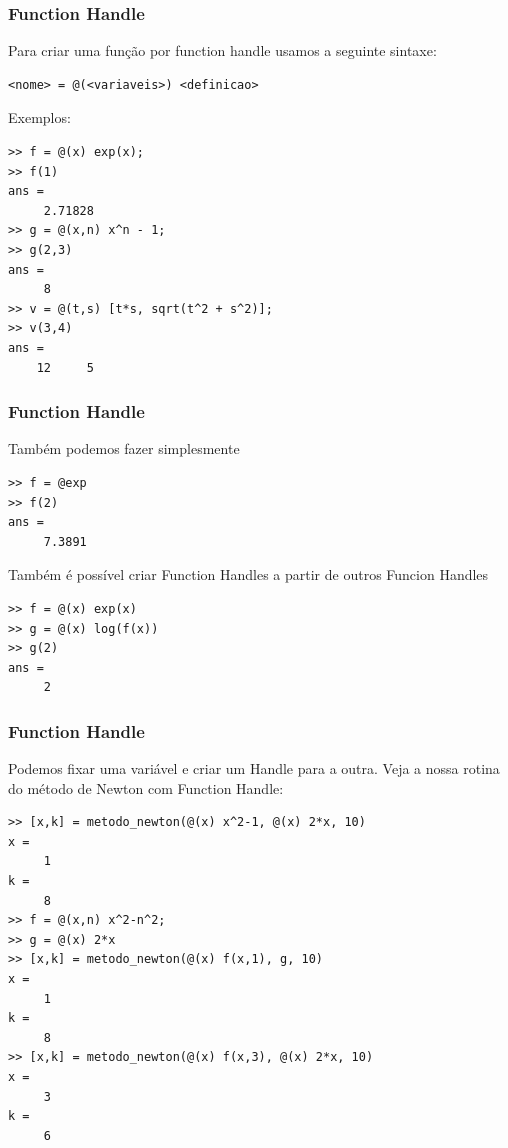 \documentclass{beamer}
\newcommand{\ssiz}{\scriptsize}
\begin{document}
\begin{frame}[fragile]
 \frametitle{Function Handle}

Para criar uma fun\c{c}\~ao por function handle usamos a seguinte sintaxe:
\pause

\begin{verbatim}
<nome> = @(<variaveis>) <definicao>
\end{verbatim}
\pause
Exemplos:
{\scriptsize
\begin{verbatim}
>> f = @(x) exp(x);
>> f(1)
ans =
     2.71828
>> g = @(x,n) x^n - 1;
>> g(2,3)
ans =
     8
>> v = @(t,s) [t*s, sqrt(t^2 + s^2)];
>> v(3,4)
ans =
    12     5
\end{verbatim}}

\end{frame}

\begin{frame}[fragile]
\frametitle{Function Handle}

Tamb\'em podemos fazer simplesmente

{\ssiz
\begin{verbatim}
>> f = @exp
>> f(2)
ans =
     7.3891
\end{verbatim}
}

\pause

Tamb\'em \'e poss\'ivel criar Function Handles a partir de outros Funcion Handles

{\ssiz
\begin{verbatim}
>> f = @(x) exp(x)
>> g = @(x) log(f(x))
>> g(2)
ans =
     2
\end{verbatim}
}

\end{frame}

\begin{frame}[fragile]
\frametitle{Function Handle}

Podemos fixar uma vari\'avel e criar um Handle para a outra.
\pause
Veja a nossa rotina do m\'etodo de Newton com Function Handle:
{\ssiz
\begin{verbatim}
>> [x,k] = metodo_newton(@(x) x^2-1, @(x) 2*x, 10)
x =
     1
k = 
     8
>> f = @(x,n) x^2-n^2;
>> g = @(x) 2*x
>> [x,k] = metodo_newton(@(x) f(x,1), g, 10)
x =
     1
k = 
     8
>> [x,k] = metodo_newton(@(x) f(x,3), @(x) 2*x, 10)
x =
     3
k = 
     6
\end{verbatim}
}

\end{frame}


\section[Exerc\'icios]{}
\end{document}
